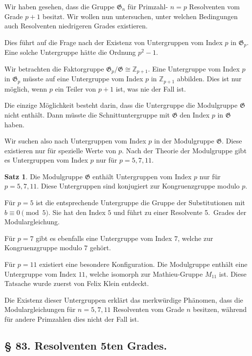 \documentclass[12pt,a4paper]{article}
\theoremstyle{definition}
\newtheorem*{satz}{Satz}
\begin{document}
Wir haben gesehen, dass die Gruppe $\mathfrak{G}_n$ f\"ur Primzahl-
$n = p$ Resolventen vom Grade $p+1$ besitzt. Wir wollen nun
untersuchen, unter welchen Bedingungen auch Resolventen
niedrigeren Grades existieren.

Dies f\"uhrt auf die Frage nach der Existenz von Untergruppen
vom Index $p$ in $\mathfrak{G}_p$. Eine solche Untergruppe h\"atte die
Ordnung $p^2 - 1$.

Wir betrachten die Faktorgruppe $\mathfrak{G}_p/\mathfrak{G} \cong \mathbb{Z}_{p+1}$.
Eine Untergruppe vom Index $p$ in $\mathfrak{G}_p$ m\"usste auf eine
Untergruppe vom Index $p$ in $\mathbb{Z}_{p+1}$ abbilden. Dies ist nur
m\"oglich, wenn $p$ ein Teiler von $p+1$ ist, was nie der Fall ist.

Die einzige M\"oglichkeit besteht darin, dass die Untergruppe
die Modulgruppe $\mathfrak{G}$ nicht enth\"alt. Dann m\"usste die
Schnittuntergruppe mit $\mathfrak{G}$ den Index $p$ in $\mathfrak{G}$ haben.

Wir suchen also nach Untergruppen vom Index $p$ in der
Modulgruppe $\mathfrak{G}$. Diese existieren nur f\"ur spezielle Werte
von $p$. Nach der Theorie der Modulgruppe gibt es Untergruppen
vom Index $p$ nur f\"ur $p = 5, 7, 11$.

\begin{satz}
Die Modulgruppe $\mathfrak{G}$ enth\"alt Untergruppen vom Index $p$
nur f\"ur $p = 5, 7, 11$. Diese Untergruppen sind konjugiert
zur Kongruenzgruppe modulo $p$.
\end{satz}

F\"ur $p = 5$ ist die entsprechende Untergruppe die Gruppe
der Substitutionen mit $b \equiv 0 \pmod{5}$. Sie hat den
Index $5$ und f\"uhrt zu einer Resolvente 5.~Grades der
Modulargleichung.

F\"ur $p = 7$ gibt es ebenfalls eine Untergruppe vom Index $7$,
welche zur Kongruenzgruppe modulo $7$ geh\"ort.

F\"ur $p = 11$ existiert eine besondere Konfiguration. Die
Modulgruppe enth\"alt eine Untergruppe vom Index $11$, welche
isomorph zur Mathieu-Gruppe $M_{11}$ ist. Diese Tatsache wurde
zuerst von Felix Klein entdeckt.

Die Existenz dieser Untergruppen erkl\"art das merkw\"urdige
Ph\"anomen, dass die Modulargleichungen f\"ur $n = 5, 7, 11$
Resolventen vom Grade $n$ besitzen, w\"ahrend f\"ur andere
Primzahlen dies nicht der Fall ist.

\newpage
\subsection*{\S{} 83. Resolventen 5ten Grades.}
\end{document}
